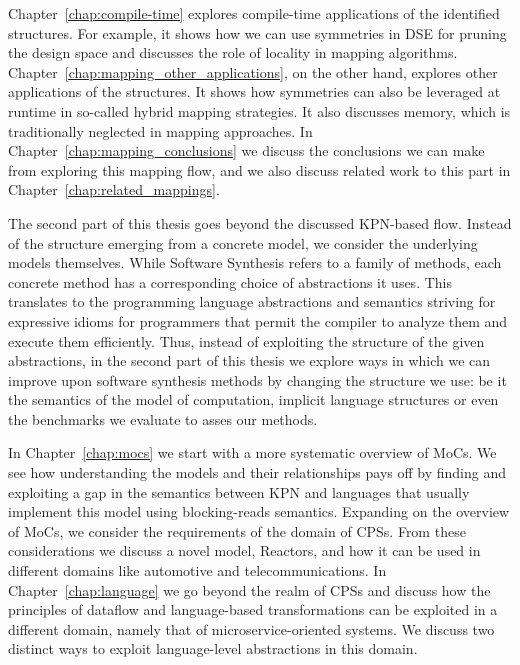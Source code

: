 Chapter~\ref{chap:compile-time} explores compile-time applications of the identified structures.
For example, it shows how we can use symmetries in \ac{DSE} for pruning the design space and discusses the role of locality in mapping algorithms.
Chapter~\ref{chap:mapping_other_applications}, on the other hand, explores other applications of the structures.
It shows how symmetries can also be leveraged at runtime in so-called hybrid mapping strategies.
It also discusses memory, which is traditionally neglected in mapping approaches.
In Chapter~\ref{chap:mapping_conclusions} we discuss the conclusions we can make from exploring this mapping flow,
and we also discuss related work to this part in Chapter~\ref{chap:related_mappings}.

The second part of this thesis goes beyond the discussed \ac{KPN}-based flow.
Instead of the structure emerging from a concrete model, we consider the underlying models themselves.
While Software Synthesis refers to a family of methods, each concrete method has a corresponding choice of abstractions it uses.
This translates to the programming language abstractions and semantics striving for expressive idioms for programmers that permit the compiler to analyze them and execute them efficiently.
Thus, instead of exploiting the structure of the given abstractions, in the second part of this thesis we explore ways in which we can improve upon software synthesis methods by changing the structure we use: be it the semantics of the model of computation, implicit language structures or even the benchmarks we evaluate to asses our methods.

In Chapter~\ref{chap:mocs} we start with a more systematic overview of \acfp{MoC}.
We see how understanding the models and their relationships pays off by finding and exploiting a gap in the semantics between \ac{KPN} and languages that usually implement this model using blocking-reads semantics.
Expanding on the overview of \acp{MoC}, we consider the requirements of the domain of \acp{CPS}.
From these considerations we discuss a novel model, Reactors, and how it can be used in different domains like automotive and telecommunications.
In Chapter~\ref{chap:language} we go beyond the realm of \acp{CPS} and discuss how the principles of dataflow and language-based transformations can be exploited in a different domain, namely that of microservice-oriented systems.
We discuss two distinct ways to exploit language-level abstractions in this domain.

